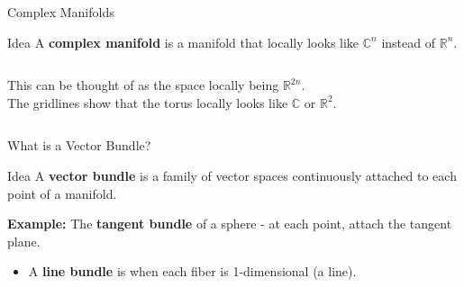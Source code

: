 \documentclass{beamer}
\begin{document}
\begin{frame}{Complex Manifolds}
  \begin{block}{Idea}
    A \textbf{complex manifold} is a manifold that locally looks like $\mathbb{C}^n$ instead of $\mathbb{R}^n$.
  \end{block}
  \begin{columns}[T]
      This can be thought of as the space locally being $\mathbb{R}^{2n}$.\\
      The gridlines show that the torus locally looks like $\mathbb{C}$ or $\mathbb{R}^{2}$.
  \end{columns}  
\end{frame}

\begin{frame}{What is a Vector Bundle?}
  \begin{block}{Idea}
    A \textbf{vector bundle} is a family of vector spaces continuously attached to each point of a manifold.
  \end{block}
  \begin{center}
  \end{center}
  \vfill
  \textbf{Example:} The \textbf{tangent bundle} of a sphere - at each point, attach the tangent plane.
  \begin{itemize}
    \item A \textbf{line bundle} is when each fiber is 1-dimensional (a line).
  \end{itemize}
\end{frame}
\end{document}
